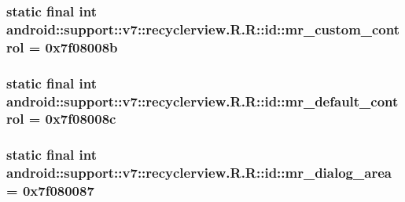 \hypertarget{classandroid_1_1support_1_1v7_1_1recyclerview_1_1_r_1_1id_b99202996ab21c27a2737fbeff03831a}{
\subsubsection[{mr\_\-custom\_\-control}]{\setlength{\rightskip}{0pt plus 5cm}static final int android::support::v7::recyclerview.R.R::id::mr\_\-custom\_\-control = 0x7f08008b}}
\label{classandroid_1_1support_1_1v7_1_1recyclerview_1_1_r_1_1id_b99202996ab21c27a2737fbeff03831a}


\hypertarget{classandroid_1_1support_1_1v7_1_1recyclerview_1_1_r_1_1id_a20f8dca0480f9502bd397f8d514ac3d}{
\subsubsection[{mr\_\-default\_\-control}]{\setlength{\rightskip}{0pt plus 5cm}static final int android::support::v7::recyclerview.R.R::id::mr\_\-default\_\-control = 0x7f08008c}}
\label{classandroid_1_1support_1_1v7_1_1recyclerview_1_1_r_1_1id_a20f8dca0480f9502bd397f8d514ac3d}


\hypertarget{classandroid_1_1support_1_1v7_1_1recyclerview_1_1_r_1_1id_56418acf84ed8cbeb6d6cbce235039d3}{
\subsubsection[{mr\_\-dialog\_\-area}]{\setlength{\rightskip}{0pt plus 5cm}static final int android::support::v7::recyclerview.R.R::id::mr\_\-dialog\_\-area = 0x7f080087}}
\label{classandroid_1_1support_1_1v7_1_1recyclerview_1_1_r_1_1id_56418acf84ed8cbeb6d6cbce235039d3}


